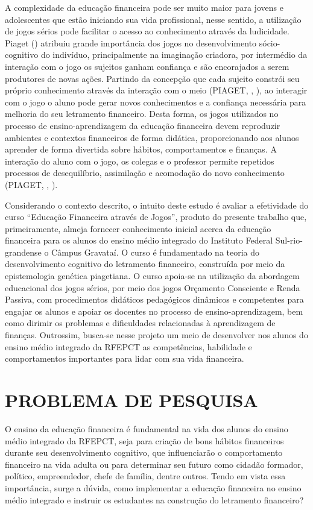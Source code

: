 A complexidade da educação financeira pode ser muito maior para jovens e adolescentes que estão iniciando sua vida profissional, nesse sentido, a utilização de jogos sérios pode facilitar o acesso ao conhecimento através da ludicidade. Piaget (\citeyear{piaget1990}) atribuiu grande importância dos jogos no desenvolvimento sócio-cognitivo do indivíduo, principalmente na imaginação criadora, por intermédio da interação com o jogo os sujeitos ganham confiança e são encorajados a serem produtores de novas ações. Partindo da concepção que cada sujeito constrói seu próprio conhecimento através da interação com o meio (PIAGET, \citeyear{piaget1971}, \citeyear{piaget1990}), ao interagir com o jogo o aluno pode gerar novos conhecimentos e a confiança necessária para melhoria do seu letramento financeiro. Desta forma, os jogos utilizados no processo de ensino-aprendizagem da educação financeira devem reproduzir ambientes e contextos financeiros de forma didática, proporcionando aos alunos aprender de forma divertida sobre hábitos, comportamentos e finanças. A interação do aluno com o jogo, os colegas e o professor permite repetidos processos de desequilíbrio, assimilação e acomodação do novo conhecimento (PIAGET, \citeyear{piaget1971}, \citeyear{piaget1990}).

Considerando o contexto descrito, o intuito deste estudo é avaliar a efetividade do curso “Educação Financeira através de Jogos”, produto do presente trabalho que, primeiramente, almeja fornecer conhecimento inicial acerca da educação financeira para os alunos do ensino médio integrado do Instituto Federal Sul-rio-grandense o Câmpus Gravataí. O curso é fundamentado na teoria do desenvolvimento cognitivo do letramento financeiro, construída por meio da epistemologia genética piagetiana. O curso apoia-se na utilização da abordagem educacional dos jogos sérios, por meio dos jogos Orçamento Consciente e Renda Passiva, com procedimentos didáticos pedagógicos dinâmicos e competentes para engajar os alunos e apoiar os docentes no processo de ensino-aprendizagem, bem como dirimir os problemas e dificuldades relacionadas à aprendizagem de finanças. Outrossim, busca-se nesse projeto um meio de desenvolver nos alunos do ensino médio integrado da RFEPCT as competências, habilidade e comportamentos importantes para lidar com sua vida financeira.

\section{PROBLEMA DE PESQUISA}
O ensino da educação financeira é fundamental na vida dos alunos do ensino médio integrado da RFEPCT, seja para criação de bons hábitos financeiros durante seu desenvolvimento cognitivo, que influenciarão o comportamento financeiro na vida adulta ou para determinar seu futuro como cidadão formador, político, empreendedor, chefe de família, dentre outros. Tendo em vista essa importância, surge a dúvida, como implementar a educação financeira no ensino médio integrado e instruir os estudantes na construção do letramento financeiro?

